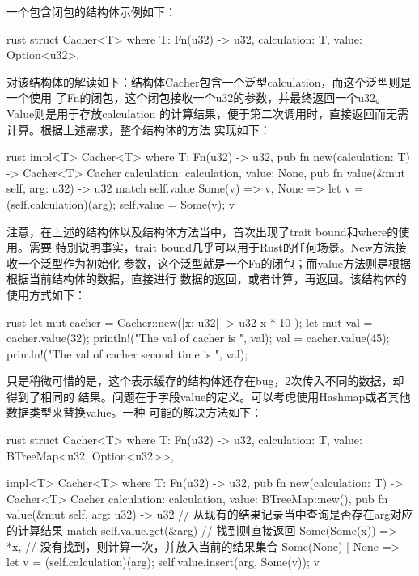 一个包含闭包的结构体示例如下：
\begin{code-block}{rust}
struct Cacher<T>
where T: Fn(u32) -> u32,
{
    calculation: T,
    value: Option<u32>,
}
\end{code-block}
对该结构体的解读如下：结构体Cacher包含一个泛型calculation，而这个泛型则是一个使用
了Fn的闭包，这个闭包接收一个u32的参数，并最终返回一个u32。Value则是用于存放calculation
的计算结果，便于第二次调用时，直接返回而无需计算。根据上述需求，整个结构体的方法
实现如下：
\begin{code-block}{rust}
impl<T> Cacher<T>
where T: Fn(u32) -> u32,
{
    pub fn new(calculation: T) -> Cacher<T> {
        Cacher {
            calculation: calculation,
            value: None,
        }
    }
    pub fn value(&mut self, arg: u32) -> u32 {
        match self.value {
            Some(v) => v,
            None => {
                let v = (self.calculation)(arg);
                self.value = Some(v);
                v
            }
        }
    }
}
\end{code-block}
注意，在上述的结构体以及结构体方法当中，首次出现了trait bound和where的使用。需要
特别说明事实，trait bound几乎可以用于Rust的任何场景。New方法接收一个泛型作为初始化
参数，这个泛型就是一个Fn的闭包；而value方法则是根据根据当前结构体的数据，直接进行
数据的返回，或者计算，再返回。该结构体的使用方式如下：
\begin{code-block}{rust}
let mut cacher = Cacher::new(|x: u32| -> u32 { x * 10 });
let mut val = cacher.value(32);
println!("The val of cacher is {}", val);
val = cacher.value(45);
println!("The val of cacher second time is {}", val);
\end{code-block}
只是稍微可惜的是，这个表示缓存的结构体还存在bug，2次传入不同的数据，却得到了相同的
结果。问题在于字段value的定义。可以考虑使用Hashmap或者其他数据类型来替换value。一种
可能的解决方法如下：
\begin{code-block}{rust}
struct Cacher<T>
where T: Fn(u32) -> u32,
{
    calculation: T,
    value: BTreeMap<u32, Option<u32>>,
}

impl<T> Cacher<T>
where T: Fn(u32) -> u32,
{
    pub fn new(calculation: T) -> Cacher<T> {
        Cacher {
            calculation: calculation,
            value: BTreeMap::new(),
        }
    }
    pub fn value(&mut self, arg: u32) -> u32 {
        // 从现有的结果记录当中查询是否存在arg对应的计算结果
        match self.value.get(&arg) {
            // 找到则直接返回
            Some(Some(x)) => *x,
            // 没有找到，则计算一次，并放入当前的结果集合
            Some(None) | None => {
                let v = (self.calculation)(arg);
                self.value.insert(arg, Some(v));
                v
            }
        }
    }
}
\end{code-block}

